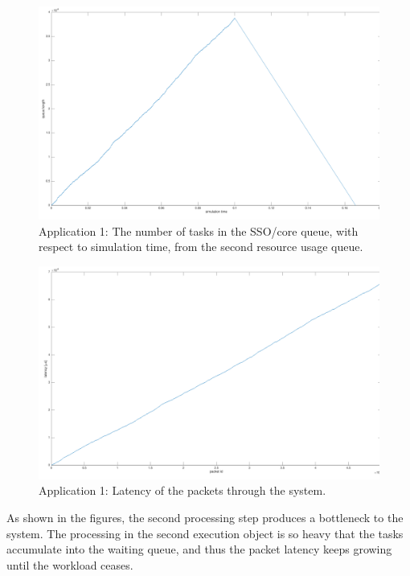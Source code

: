 \begin{figure}[]
  \begin{center}
    \includegraphics[width=\textwidth]{images/app1-queue2.pdf}
    \caption{Application 1: The number of tasks in the SSO/core queue, with respect to simulation time, from the second resource usage queue.}
    \label{fig:app1-queue2}
  \end{center}
\end{figure}

\begin{figure}[]
  \begin{center}
    \includegraphics[width=\textwidth]{images/app1-latency.pdf}
    \caption{Application 1: Latency of the packets through the system.}
    \label{fig:app1-latency}
  \end{center}
\end{figure}

As shown in the figures, the second processing step produces a bottleneck to the system. The processing in the second execution object is so heavy that the tasks accumulate into the waiting queue, and thus the packet latency keeps growing until the workload ceases.

